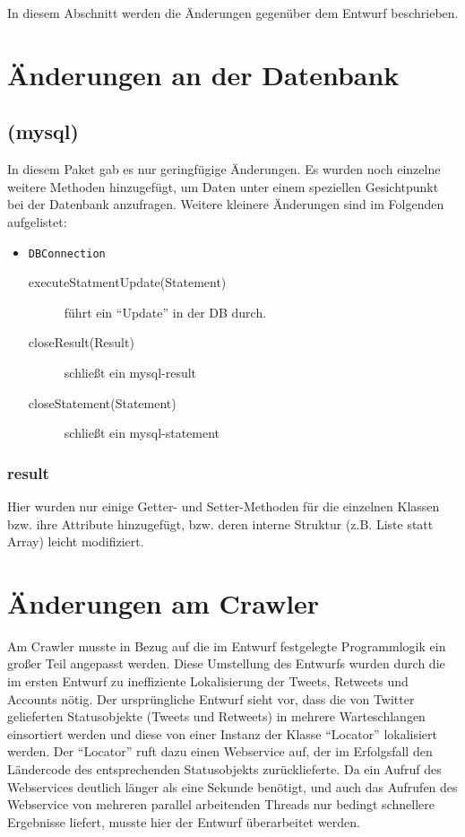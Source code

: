 In diesem Abschnitt werden die Änderungen gegenüber dem Entwurf beschrieben.

\section{Änderungen an der Datenbank}

\subsection{(mysql)}
In diesem Paket gab es nur geringfügige Änderungen. Es wurden noch einzelne weitere Methoden hinzugefügt, um Daten unter einem speziellen Gesichtpunkt bei der Datenbank anzufragen. Weitere kleinere Änderungen sind im Folgenden aufgelistet:
\begin{itemize}
	\item \lstinline{DBConnection}
	\begin{description}
		\item[executeStatmentUpdate(Statement)] führt ein "`Update"' in der DB durch.
		\item[closeResult(Result)] schließt ein mysql-result
		\item[closeStatement(Statement)] schließt ein mysql-statement
	\end{description}
\end{itemize}
	
\subsubsection{result}
Hier wurden nur einige Getter- und Setter-Methoden für die einzelnen Klassen bzw. ihre Attribute hinzugefügt, bzw. deren interne Struktur (z.B. Liste statt Array) leicht modifiziert.

\section{Änderungen am Crawler}
Am Crawler musste in Bezug auf die im Entwurf festgelegte Programmlogik ein großer Teil angepasst werden. Diese Umstellung des Entwurfs wurden durch die im ersten Entwurf zu ineffiziente Lokalisierung der Tweets, Retweets und Accounts nötig. Der ursprüngliche Entwurf sieht vor, dass die von Twitter gelieferten Statusobjekte (Tweets und Retweets) in mehrere Warteschlangen einsortiert werden und diese von einer Instanz der Klasse "`Locator"' lokalisiert werden. Der "`Locator"' ruft dazu einen Webservice auf, der im Erfolgsfall den Ländercode des entsprechenden Statusobjekts zurücklieferte. Da ein Aufruf des Webservices deutlich länger als eine Sekunde benötigt, und auch das Aufrufen des Webservice von mehreren parallel arbeitenden Threads nur bedingt schnellere Ergebnisse liefert, musste hier der Entwurf überarbeitet werden.

